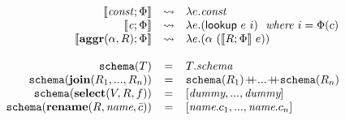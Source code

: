 \[\begin{array}{rcl}
\llbracket \mathit{const};\Phi \rrbracket & \leadsto & \lambda e.\mathit{const}\\
\llbracket \mathit{c};\Phi \rrbracket & \leadsto & \lambda e. (\mathsf{lookup}~e~i)~~\textit{where $i=\Phi(c)$}\\
\llbracket \mathbf{aggr}(\alpha, R);\Phi \rrbracket & \leadsto & \lambda e.(\alpha~(\llbracket R;\Phi\rrbracket~e))\\
\\
\mathtt{schema}(T) & = & T.\mathit{schema}\\
\mathtt{schema}(\mathbf{join}(R_1,...,R_n)) & = & \mathtt{schema}( R_1) \concat ...\concat \mathtt{schema}(R_n)\\
\mathtt{schema}(\mathbf{select}(V, R, f))&=& [\textit{dummy},...,\textit{dummy}]\\
\mathtt{schema}(\mathbf{rename}(R, \textit{name}, \bar{c})) &=& [\textit{name}.c_1,...,\textit{name}.c_n]\\
\end{array}
\]

